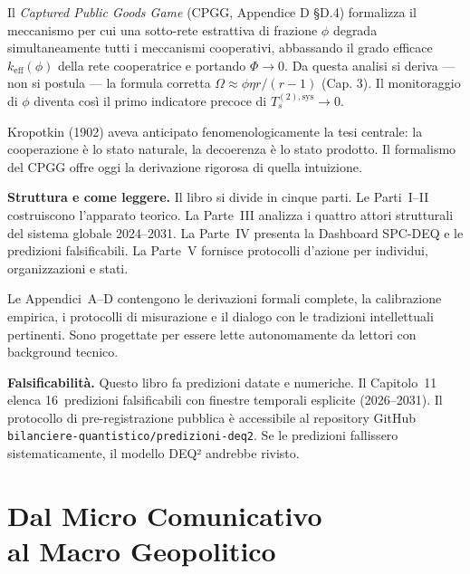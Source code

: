 \documentclass[12pt, twoside]{book}
\theoremstyle{plain}
\theoremstyle{definition}
\theoremstyle{remark}
\begin{document}
Il \textit{Captured Public Goods Game} (CPGG, Appendice D §D.4) formalizza il meccanismo per cui una sotto-rete estrattiva di frazione $\phi$ degrada simultaneamente tutti i meccanismi cooperativi, abbassando il grado efficace $k_\text{eff}(\phi)$ della rete cooperatrice e portando $\Phi \to 0$. Da questa analisi si deriva --- non si postula --- la formula corretta $\Omega \approx \phi\eta r/(r-1)$ (Cap. 3). Il monitoraggio di $\phi$ diventa così il primo indicatore precoce di $T_s^{(2),\text{sys}} \to 0$.

Kropotkin (1902) aveva anticipato fenomenologicamente la tesi centrale: la cooperazione è lo stato naturale, la decoerenza è lo stato prodotto. Il formalismo del CPGG offre oggi la derivazione rigorosa di quella intuizione.

\textbf{Struttura e come leggere.}
Il libro si divide in cinque parti. Le Parti~I--II costruiscono l'apparato teorico. La Parte~III analizza i quattro attori strutturali del sistema globale 2024--2031. La Parte~IV presenta la Dashboard SPC-DEQ e le predizioni falsificabili. La Parte~V fornisce protocolli d'azione per individui, organizzazioni e stati.

Le Appendici~A--D contengono le derivazioni formali complete, la calibrazione empirica, i protocolli di misurazione e il dialogo con le tradizioni intellettuali pertinenti. Sono progettate per essere lette autonomamente da lettori con background tecnico.

\textbf{Falsificabilità.}
Questo libro fa predizioni datate e numeriche. Il Capitolo~11 elenca 16~predizioni falsificabili con finestre temporali esplicite (2026--2031). Il protocollo di pre-registrazione pubblica è accessibile al repository GitHub \texttt{bilanciere-quantistico/predizioni-deq2}. Se le predizioni fallissero sistematicamente, il modello DEQ² andrebbe rivisto.

\cleardoublepage
{}

\part[Dal Micro Comunicativo al Macro Geopolitico]{Dal Micro Comunicativo\\al Macro Geopolitico}




\end{document}
